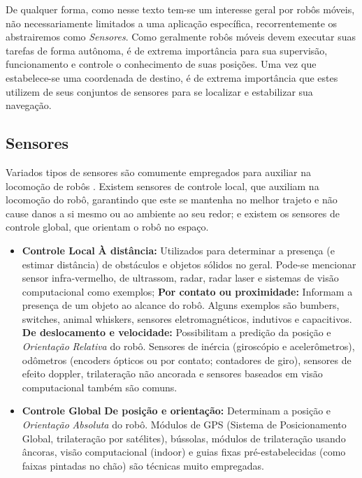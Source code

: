 De qualquer forma, como nesse texto tem-se um interesse geral por robôs móveis, não necessariamente limitados a uma aplicação específica, recorrentemente os abstrairemos como \textit{Sensores}. Como geralmente robôs móveis devem executar suas tarefas de forma autônoma, é de extrema importância para sua supervisão, funcionamento e controle o conhecimento de suas posições. Uma vez que estabelece-se uma coordenada de destino, é de extrema importância que estes utilizem de seus conjuntos de sensores para se localizar e estabilizar sua navegação.

\subsection{Sensores}
Variados tipos de sensores são comumente empregados para auxiliar na locomoção de robôs \cite{sensorsForMobileRobots}. Existem sensores de controle local, que auxiliam na locomoção do robô, garantindo que este se mantenha no melhor trajeto e não cause danos a si mesmo ou ao ambiente ao seu redor; e existem os sensores de controle global, que orientam o robô no espaço.
\begin{itemize}
	\item \textbf{Controle Local}
	\subitem \textbf{À distância:} Utilizados para determinar a presença (e estimar distância) de obstáculos e objetos sólidos no geral. Pode-se mencionar sensor infra-vermelho, de ultrassom, radar, radar laser e sistemas de visão computacional como exemplos; 
	\subitem \textbf{Por contato ou proximidade:} Informam a presença de um objeto ao alcance do robô. Alguns exemplos são bumbers, switches, animal whiskers, sensores eletromagnéticos, indutivos e capacitivos.
	\subitem \textbf{De deslocamento e velocidade:} Possibilitam a predição da posição e \textit{Orientação} \textit{Relativa} do robô. Sensores de inércia (giroscópio e acelerômetros), odômetros (encoders ópticos ou por contato; contadores de giro), sensores de efeito doppler, trilateração não ancorada e sensores baseados em visão computacional também são comuns.
	\item \textbf{Controle Global}
	\subitem \textbf{De posição e orientação: } Determinam a posição e \textit{Orientação} \textit{Absoluta} do robô. Módulos de GPS (Sistema de Posicionamento Global, trilateração por satélites), bússolas, módulos de trilateração usando âncoras, visão computacional (indoor) e guias fixas pré-estabelecidas (como faixas pintadas no chão) são técnicas muito empregadas.
\end{itemize}

